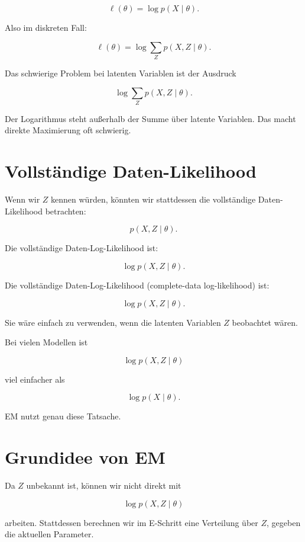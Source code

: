 \[
    \ell(\theta)
    =
    \log p(X\mid\theta).
\]

Also im diskreten Fall:

\[
    \ell(\theta)
    =
    \log
    \sum_Z
    p(X,Z\mid\theta).
\]

\begin{conceptbox}
Das schwierige Problem bei latenten Variablen ist der Ausdruck

\[
    \log
    \sum_Z
    p(X,Z\mid\theta).
\]

Der Logarithmus steht außerhalb der Summe über latente Variablen.
Das macht direkte Maximierung oft schwierig.
\end{conceptbox}

\section{Vollständige Daten-Likelihood}

Wenn wir \(Z\) kennen würden, könnten wir stattdessen die vollständige Daten-Likelihood betrachten:

\[
    p(X,Z\mid\theta).
\]

Die vollständige Daten-Log-Likelihood ist:

\[
    \log p(X,Z\mid\theta).
\]

\begin{definitionbox}
Die vollständige Daten-Log-Likelihood (complete-data log-likelihood) ist:

\[
    \log p(X,Z\mid\theta).
\]

Sie wäre einfach zu verwenden, wenn die latenten Variablen \(Z\) beobachtet wären.
\end{definitionbox}

Bei vielen Modellen ist

\[
    \log p(X,Z\mid\theta)
\]

viel einfacher als

\[
    \log p(X\mid\theta).
\]

EM nutzt genau diese Tatsache.

\section{Grundidee von EM}

Da \(Z\) unbekannt ist, können wir nicht direkt mit

\[
    \log p(X,Z\mid\theta)
\]

arbeiten.
Stattdessen berechnen wir im E-Schritt eine Verteilung über \(Z\), gegeben die aktuellen Parameter.

